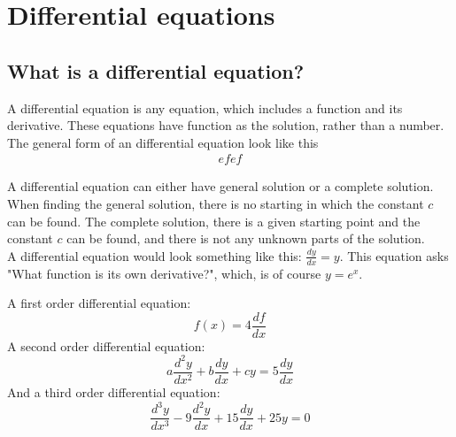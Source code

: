 \chapter{Differential equations}

\section{What is a differential equation?}
A differential equation is any equation, which includes a function and its derivative. These equations have function as the solution, rather than a number.  \\
The general form of an differential equation look like this
\begin{align*}
efef
\end{align*}

A differential equation can either have general solution or a complete solution. When finding the general solution, there is no starting in which the constant $c$ can be found. The complete solution, there is a given starting point and the constant $c$ can be found, and there is not any unknown parts of the solution. \\

A differential equation would look something like this: $\frac{dy}{dx} = y$. This equation asks "What function is its own derivative?", which, is of course $y=e^x$. \\




\begin{tcolorbox}[colback=red!5!white,colframe=red!75!black,title=Example of differential equation of different orders] 
A first order differential equation:
$$f(x)=4\frac{df}{dx} $$
A second order differential equation:
$$a\frac{d^2y}{dx^2}+b\frac{dy}{dx}+cy = 5\frac{dy}{dx}$$
And a third order differential equation:
$$\frac{d^3y}{dx^3} - 9\frac{d^2y}{dx} + 15\frac{dy}{dx} + 25y = 0$$
\end{tcolorbox}

